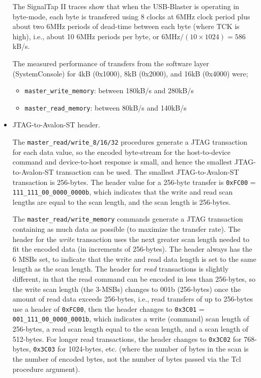 \documentclass[10pt,twoside]{article}
\begin{document}
\begin{itemize}
The SignalTap II traces show that when the USB-Blaster is operating
in byte-mode, each byte is transfered using 8 clocks at 6MHz clock
period plus about two 6MHz periods of dead-time between each byte 
(where TCK is high), i.e., about 10
6MHz periods per byte, or $6\text{MHz}/(10\times1024) = 586$kB/s.

The measured performance of transfers from the software layer
(SystemConsole) for 4kB (0x1000), 8kB (0x2000), and 16kB (0x4000)
were;
\begin{itemize}
\item \verb+master_write_memory+: between 180kB/s and 280kB/s
\item \verb+master_read_memory+: between 80kB/s and 140kB/s
\end{itemize}
%
\item JTAG-to-Avalon-ST header.

The \verb+master_read/write_8/16/32+ procedures generate a
JTAG transaction for each data value, so the encoded byte-stream
for the host-to-device command and device-to-host response is
small, and hence the smallest JTAG-to-Avalon-ST transaction
can be used. The smallest JTAG-to-Avalon-ST transaction is 256-bytes.
The header value for a 256-byte transfer is
\verb+0xFC00+ = \verb+111_111_00_0000_0000b+, which indicates
that the write and read scan lengths are equal to the scan length,
and the scan length is 256-bytes.

The \verb+master_read/write_memory+ commands generate a JTAG
transaction containing as much data as possible (to maximize
the transfer rate). The header for the {\em write} transaction
uses the next greater scan length needed to fit the encoded
data (in increments of 256-bytes). The header always has
the 6 MSBs set, to indicate that the write and read data length
is set to the same length as the scan length.
The header for {\em read} transactions is slightly different, in
that the read command can be encoded in less than 256-bytes,
so the write scan length (the 3-MSBs) changes to 001b (256-bytes)
once the amount of read data exceeds 256-bytes, i.e., 
read transfers of up to 256-bytes use a header of \verb+0xFC00+, 
then the header changes to \verb+0x3C01+ = \verb+001_111_00_0000_0001b+,
which indicates a write (command) scan length of 256-bytes,
a read scan length equal to the scan length, and a scan 
length of 512-bytes. For longer read transactions, the header
changes to \verb+0x3C02+ for 768-bytes, \verb+0x3C03+ for 1024-bytes, 
etc. (where the number of bytes in the scan is the number of
encoded bytes, not the number of bytes passed via
the Tcl procedure argument).


\end{itemize}
\end{document}

